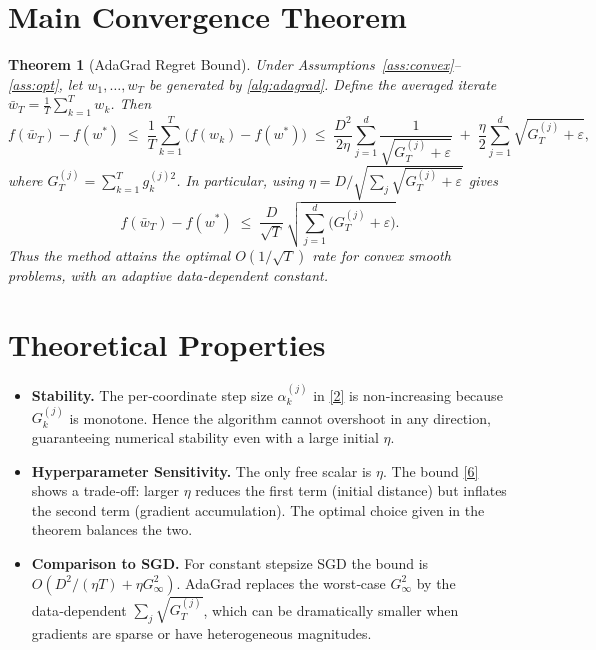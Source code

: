 \documentclass{article}
\newtheorem{theorem}{Theorem}
\begin{document}
\section*{Main Convergence Theorem}
\begin{theorem}[AdaGrad Regret Bound]\label{thm:adagrad}
Under Assumptions~\ref{ass:convex}–\ref{ass:opt}, let $w_{1},\dots,w_{T}$
be generated by \eqref{alg:adagrad}. Define the averaged iterate
$\bar w_{T}= \frac{1}{T}\sum_{k=1}^{T} w_{k}$. Then
\[
f(\bar w_{T})-f(w^{\ast})
\;\le\;
\frac{1}{T}\sum_{k=1}^{T}\bigl(f(w_{k})-f(w^{\ast})\bigr)
\;\le\;
\frac{D^{2}}{2\eta}\sum_{j=1}^{d}\frac{1}{\sqrt{G_{T}^{(j)}+\varepsilon}}
\;+\;
\frac{\eta}{2}\sum_{j=1}^{d}\sqrt{G_{T}^{(j)}+\varepsilon},
\tag{6}
\]
where $G_{T}^{(j)}=\sum_{k=1}^{T} g_{k}^{(j)2}$.
In particular, using $\eta = D/\sqrt{\sum_{j}\sqrt{G_{T}^{(j)}+\varepsilon}}$
gives
\[
f(\bar w_{T})-f(w^{\ast})\;\le\;
\frac{D}{\sqrt{T}}\,
\sqrt{\sum_{j=1}^{d}\bigl(G_{T}^{(j)}+\varepsilon\bigr)}.
\tag{7}
\]
Thus the method attains the optimal $O(1/\sqrt{T})$ rate for convex
smooth problems, with an adaptive data‑dependent constant.
\end{theorem}

\section*{Theoretical Properties}
\begin{itemize}
\item \textbf{Stability.} The per‑coordinate step size $\alpha_{k}^{(j)}$
in \eqref{2} is non‑increasing because $G_{k}^{(j)}$ is monotone.
Hence the algorithm cannot overshoot in any direction, guaranteeing
numerical stability even with a large initial $\eta$.
\item \textbf{Hyperparameter Sensitivity.} The only free scalar is
$\eta$. The bound \eqref{6} shows a trade‑off: larger $\eta$ reduces the
first term (initial distance) but inflates the second term (gradient
accumulation). The optimal choice given in the theorem balances the two.
\item \textbf{Comparison to SGD.} For constant stepsize SGD the bound is
$O(D^{2}/(\eta T)+\eta G_{\infty}^{2})$. AdaGrad replaces the worst‑case
$G_{\infty}^{2}$ by the data‑dependent $\sum_{j}\sqrt{G_{T}^{(j)}}$, which
can be dramatically smaller when gradients are sparse or have
heterogeneous magnitudes.
\end{itemize}
\end{document}
